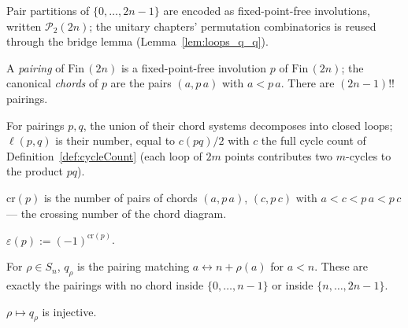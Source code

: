 Pair partitions of $\{0,\dots,2n-1\}$ are encoded as fixed-point-free
involutions, written $\mathcal P_2(2n)$; the unitary chapters' permutation
combinatorics is reused through the bridge lemma
(Lemma~\ref{lem:loops_q_q}).

\begin{definition}\label{def:pairing}
\leanok
A \emph{pairing} of $\mathrm{Fin}\,(2n)$ is a fixed-point-free involution
$p$ of $\mathrm{Fin}\,(2n)$; the canonical \emph{chords} of $p$ are the
pairs $(a, p\,a)$ with $a < p\,a$. There are $(2n-1)!!$ pairings.
\end{definition}

\begin{definition}[Loops]\label{def:loops}
\leanok
{}
For pairings $p,q$, the union of their chord systems decomposes into closed
loops; $\ell(p,q)$ is their number, equal to $c(pq)/2$ with $c$ the full
cycle count of Definition~\ref{def:cycleCount} (each loop of $2m$ points
contributes two $m$-cycles to the product $pq$).
\end{definition}

\begin{definition}[Crossings]\label{def:crossings}
\leanok
{}
$\mathrm{cr}(p)$ is the number of pairs of chords $(a,p\,a)$, $(c,p\,c)$
with $a < c < p\,a < p\,c$ --- the crossing number of the chord diagram.
\end{definition}

\begin{definition}\label{def:eps_sign}
\leanok
{}
$\varepsilon(p) := (-1)^{\mathrm{cr}(p)}$.
\end{definition}

\begin{definition}\label{def:q_pairing}
\leanok
{}
For $\rho\in S_n$, $q_\rho$ is the pairing matching $a \leftrightarrow
n+\rho(a)$ for $a < n$. These are exactly the pairings with no chord inside
$\{0,\dots,n-1\}$ or inside $\{n,\dots,2n-1\}$.
\end{definition}

\begin{lemma}[Injectivity]\label{lem:q_pairing_inj}
\leanok
{}
$\rho\mapsto q_\rho$ is injective.
\end{lemma}

